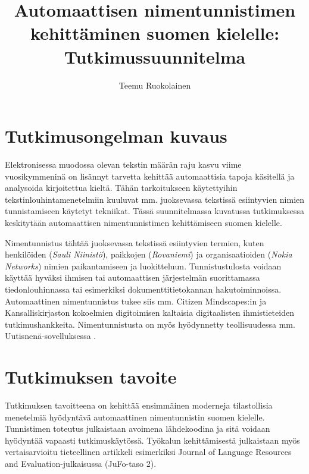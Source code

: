 \documentclass[12pt,a4paper,finnish,oneside]{article}
\begin{document}
\title{Automaattisen nimentunnistimen kehittäminen suomen kielelle: Tutkimussuunnitelma}
\date{}
\author{Teemu Ruokolainen}


\maketitle


\section{Tutkimusongelman kuvaus}

Elektronisessa muodossa olevan tekstin määrän raju kasvu viime vuosikymmeninä on lisännyt tarvetta kehittää automaattisia tapoja käsitellä ja analysoida kirjoitettua kieltä. Tähän tarkoitukseen käytettyihin tekstinlouhintamenetelmiin kuuluvat mm. juoksevassa tekstissä esiintyvien nimien tunnistamiseen käytetyt tekniikat. Tässä suunnitelmassa kuvatussa tutkimuksessa keskitytään automaattisen nimentunnistimen kehittämiseen suomen kielelle. 


Nimentunnistus tähtää juoksevassa tekstissä esiintyvien termien, kuten henkilöiden (\textit{Sauli Niinistö}), paikkojen (\textit{Rovaniemi}) ja organisaatioiden (\textit{Nokia Networks}) nimien paikantamiseen ja luokitteluun. Tunnistustulosta voidaan käyttää hyväksi ihmisen tai automaattisen järjestelmän suorittamassa tiedonlouhinnassa tai esimerkiksi dokumenttitietokannan hakutoiminnoissa. Automaattinen nimentunnistus tukee siis mm. Citizen Mindscapes:in \cite{citizenmindscapes} ja Kansalliskirjaston kokoelmien digitoimisen \cite{} kaltaisia digitaalisten ihmistieteiden tutkimushankkeita. Nimentunnistusta on myös hyödynnetty teollisuudessa mm. Uutisnenä-sovelluksessa \cite{huovelin2013}.


\section{Tutkimuksen tavoite}

Tutkimuksen tavoitteena on kehittää ensimmäinen moderneja tilastollisia menetelmiä hyödyntävä automaattinen nimentunnistin suomen kielelle. Tunnistimen toteutus julkaistaan avoimena lähdekoodina ja sitä voidaan hyödyntää vapaasti tutkimuskäytössä. Työkalun kehittämisestä julkaistaan myös vertaisarvioitu tieteellinen artikkeli esimerkiksi Journal of Language Resources and Evaluation-julkaisussa (JuFo-taso 2).
\end{document}
